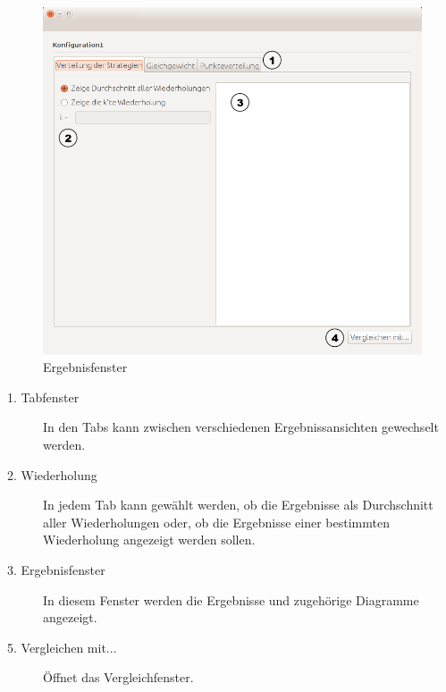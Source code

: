 \begin{figure}[!hp] 
  \centering
     \includegraphics[width=1.1\textwidth]{GUI_Entwurf/EinfacheErgebnisse.png}
  \caption{Ergebnisfenster}
  \label{fig:Bild7}
\end{figure}

\begin{description}

\item[1. Tabfenster] In den Tabs kann zwischen verschiedenen Ergebnissansichten gewechselt werden.

\item[2. Wiederholung] In jedem Tab kann gewählt werden, ob die Ergebnisse als Durchschnitt aller Wiederholungen oder, ob die Ergebnisse einer bestimmten Wiederholung angezeigt werden sollen.

\item[3. Ergebnisfenster] In diesem Fenster werden die Ergebnisse und zugehörige Diagramme angezeigt.

\item[5. Vergleichen mit...] Öffnet das Vergleichfenster.

\end{description}


